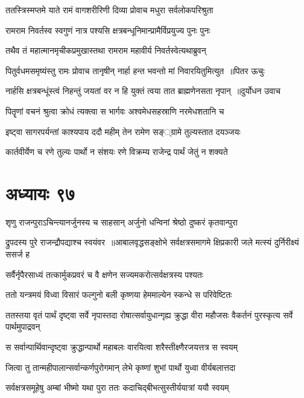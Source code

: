 \twolineshloka
{ततस्त्रिस्मप्तमे याते रामं वागशरीरिणी}
{दिव्या प्रोवाच मधुरा सर्वलोकपरिश्रुता}


\twolineshloka
{रामराम निवर्तस्व स्वगुणं नात्र पश्यसि}
{क्षत्रबन्धूनिमान्प्रामैर्विप्रयुज्य पुनः पुनः}


\twolineshloka
{तथैव तं महात्मानमृचीकप्रमुखास्तथा}
{रामराम महावीर्य निवर्तस्वेत्यथाब्रुवन्}


\threelineshloka
{पितुर्वधमसमृष्यंस्तु रामः प्रोवाच तानृषीन्}
{नार्हा हन्त भवन्तो मां निवारयितुमित्युत ॥पितर ऊचुः}
{}


\twolineshloka
{नार्हसि क्षत्रबन्धूंस्त्वं निहन्तुं जयतां वर}
{न हि युक्तं त्वया तात ब्राह्मणेनसता नृपान् ॥दुर्योधन उवाच}


\twolineshloka
{पितॄणां वचनं श्रुत्वा क्रोधं त्यक्त्वा स भार्गवः}
{अश्वमेधसहस्राणि नरमेधशतानि च}


\twolineshloka
{इष्ट्वा सागरपर्यन्तां काश्यपाय ददौ महीम्}
{तेन रामेण सङ््ग्रामे तुल्यस्तात दयञ्जयः}


\twolineshloka
{कार्तवीर्येण च रणे तुल्यः पार्थो न संशयः}
{रणे विक्रम्य राजेन्द्र पार्थं जेतुं न शक्यते}


\chapter{अध्यायः ९७}
\twolineshloka
{शृणु राजन्पुराऽचिन्त्यानर्जुनस्य च साहसान्}
{अर्जुनो धन्विनां श्रेष्ठो दुष्करं कृतवान्पुरा}


\twolineshloka
{द्रुपदस्य पुरे राजन्द्रौपद्याश्च स्वयंवर ॥आबालवृद्धसङ्क्षोभे सर्वक्षत्रसमागमे}
{क्षिप्रकारी जले मत्स्यं दुर्निरीक्ष्यं ससर्ज ह}


\twolineshloka
{सर्वैर्नृपैरसाध्यं तत्कार्मुकप्रवरं च वै}
{क्षणेन सज्यमकरोत्सर्वक्षत्रस्य पश्यतः}


\twolineshloka
{ततो यन्त्रमयं विध्वा विसारं फल्गुनो बली}
{कृष्णया हेममाल्येन स्कन्धे स परिवेष्टितः}


\threelineshloka
{ततस्तया वृतं पार्थं दृष्ट्वा सर्वे नृपास्तदा}
{रोषात्सर्वायुधान्गृह्य क्रुद्धा वीरा महौजसः}
{वैकर्तनं पुरस्कृत्य सर्वे पार्थमुपाद्रवन्}


\twolineshloka
{स सर्वान्पार्थिवान्दृष्ट्वा क्रुद्धान्पार्थो महाबलः}
{वारयित्वा शरैस्तीक्ष्णैरजयत्तत्र स स्वयम्}


\twolineshloka
{जित्वा तु तान्महीपालान्सर्वान्कर्णपुरोगमान्}
{लेभे कृष्णां शुभां पार्थो युध्वा वीर्यबलात्तदा}


\twolineshloka
{सर्वक्षत्रसमूहेषु अम्बां भीष्मो यथा पुरा}
{ततः कदाचिद्बीभत्सुस्तीर्ययात्रां ययौ स्वयम्}


